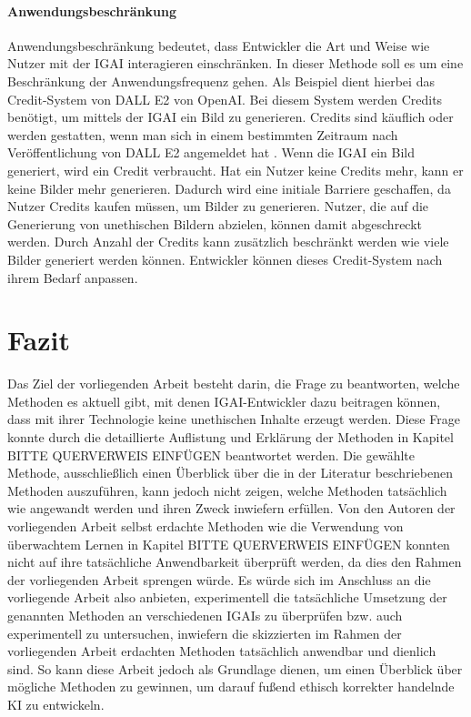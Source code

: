 \documentclass[12pt]{report}
\begin{document}
\subsubsection{Anwendungsbeschränkung}
Anwendungsbeschränkung bedeutet, dass Entwickler die Art und Weise wie Nutzer mit der IGAI interagieren einschränken. In dieser Methode soll es um eine Beschränkung der Anwendungsfrequenz gehen. Als Beispiel dient hierbei das Credit-System von DALL E2 von OpenAI. Bei diesem System werden Credits benötigt, um mittels der IGAI ein Bild zu generieren. Credits sind käuflich oder werden gestatten, wenn man sich in einem bestimmten Zeitraum nach Veröffentlichung von DALL E2 angemeldet hat \cite{Jang}. Wenn die IGAI ein Bild generiert, wird ein Credit verbraucht. Hat ein Nutzer keine Credits mehr, kann er keine Bilder mehr generieren. Dadurch wird eine initiale Barriere geschaffen, da Nutzer Credits kaufen müssen, um Bilder zu generieren. Nutzer, die auf die Generierung von unethischen Bildern abzielen, können damit abgeschreckt werden. Durch Anzahl der Credits kann zusätzlich beschränkt werden wie viele Bilder generiert werden können. Entwickler können dieses Credit-System nach ihrem Bedarf anpassen.

\chapter{Fazit}
Das Ziel der vorliegenden Arbeit besteht darin, die Frage zu beantworten, welche Methoden es aktuell gibt, mit denen IGAI-Entwickler dazu beitragen können, dass mit ihrer Technologie keine unethischen Inhalte erzeugt werden. Diese Frage konnte durch die detaillierte Auflistung und Erklärung der Methoden in Kapitel BITTE QUERVERWEIS EINFÜGEN beantwortet werden. Die gewählte Methode, ausschließlich einen Überblick über die in der Literatur beschriebenen Methoden auszuführen, kann jedoch nicht zeigen, welche Methoden tatsächlich wie angewandt werden und ihren Zweck inwiefern erfüllen. Von den Autoren der vorliegenden Arbeit selbst erdachte Methoden wie die Verwendung von überwachtem Lernen in Kapitel BITTE QUERVERWEIS EINFÜGEN konnten nicht auf ihre tatsächliche Anwendbarkeit überprüft werden, da dies den Rahmen der vorliegenden Arbeit sprengen würde. Es würde sich im Anschluss an die vorliegende Arbeit also anbieten, experimentell die tatsächliche Umsetzung der genannten Methoden an verschiedenen IGAIs zu überprüfen bzw. auch experimentell zu untersuchen, inwiefern die skizzierten im Rahmen der vorliegenden Arbeit erdachten Methoden tatsächlich anwendbar und dienlich sind.
So kann diese Arbeit jedoch als Grundlage dienen, um einen Überblick über mögliche Methoden zu gewinnen, um darauf fußend ethisch korrekter handelnde KI zu entwickeln.




\end{document}
